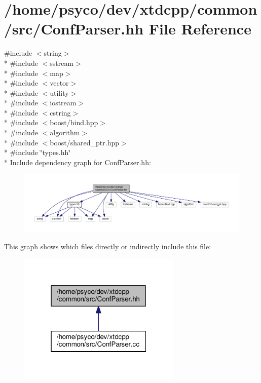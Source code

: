 \hypertarget{ConfParser_8hh}{}\section{/home/psyco/dev/xtdcpp/common/src/\+Conf\+Parser.hh File Reference}
\label{ConfParser_8hh}
{\ttfamily \#include $<$string$>$}\\*
{\ttfamily \#include $<$sstream$>$}\\*
{\ttfamily \#include $<$map$>$}\\*
{\ttfamily \#include $<$vector$>$}\\*
{\ttfamily \#include $<$utility$>$}\\*
{\ttfamily \#include $<$iostream$>$}\\*
{\ttfamily \#include $<$cstring$>$}\\*
{\ttfamily \#include $<$boost/bind.\+hpp$>$}\\*
{\ttfamily \#include $<$algorithm$>$}\\*
{\ttfamily \#include $<$boost/shared\+\_\+ptr.\+hpp$>$}\\*
{\ttfamily \#include \char`\"{}types.\+hh\char`\"{}}\\*
Include dependency graph for Conf\+Parser.\+hh\+:
\nopagebreak
\begin{figure}[H]
\begin{center}
\leavevmode
\includegraphics[width=350pt]{ConfParser_8hh__incl}
\end{center}
\end{figure}
This graph shows which files directly or indirectly include this file\+:
\nopagebreak
\begin{figure}[H]
\begin{center}
\leavevmode
\includegraphics[width=220pt]{ConfParser_8hh__dep__incl}
\end{center}
\end{figure}

